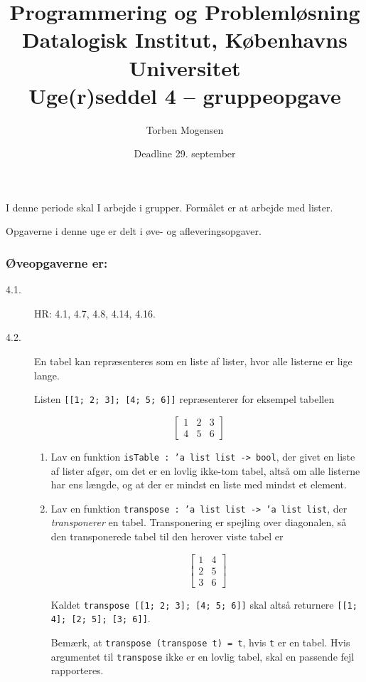 \documentclass[a4paper]{article}
\begin{document}
\title{Programmering og Problemløsning\\
Datalogisk Institut, Københavns Universitet\\
Uge(r)seddel 4 -- gruppeopgave}

\author{Torben Mogensen}
\date{Deadline 29. september}

\maketitle

\noindent
I denne periode skal I arbejde i grupper.  Formålet er at arbejde med lister.

Opgaverne i denne uge er delt i øve- og afleveringsopgaver.

\subsubsection*{Øveopgaverne er:}

\begin{description}
\item[4.1.] HR: 4.1, 4.7, 4.8, 4.14, 4.16.

\item[4.2.] En tabel kan repræsenteres som en liste af lister, hvor alle
  listerne er lige lange.

Listen \texttt{[[1; 2; 3]; [4; 5; 6]]} repræsenterer for eksempel tabellen

\[\left [\begin{array}{rrr}
1 & 2 & 3 \\
4 & 5 & 6
\end{array}
\right ]\]

\begin{enumerate}[i]
\item Lav en funktion \texttt{isTable : 'a list list -> bool}, der
  givet en liste af lister afgør, om det er en lovlig ikke-tom tabel,
  altså om alle listerne har ens længde, og at der er mindst en liste
  med mindst et element.

\item Lav en funktion \texttt{transpose : 'a list list -> 'a list
  list}, der \emph{transponerer} en tabel.  Transponering er spejling over
  diagonalen, så den transponerede tabel til den herover viste tabel er

\[\left [\begin{array}{rr}
1 & 4 \\
2 & 5 \\
3 & 6
\end{array}
\right ]\]

\noindent
Kaldet \texttt{transpose [[1; 2; 3]; [4; 5; 6]]} skal altså returnere \texttt{[[1; 4]; [2; 5]; [3; 6]]}.

Bemærk, at \texttt{transpose (transpose t) = t}, hvis \texttt{t} er en
tabel.  Hvis argumentet til \texttt{transpose} ikke er en lovlig
tabel, skal en passende fejl rapporteres.

\end{enumerate}

\end{description}
\end{document}
